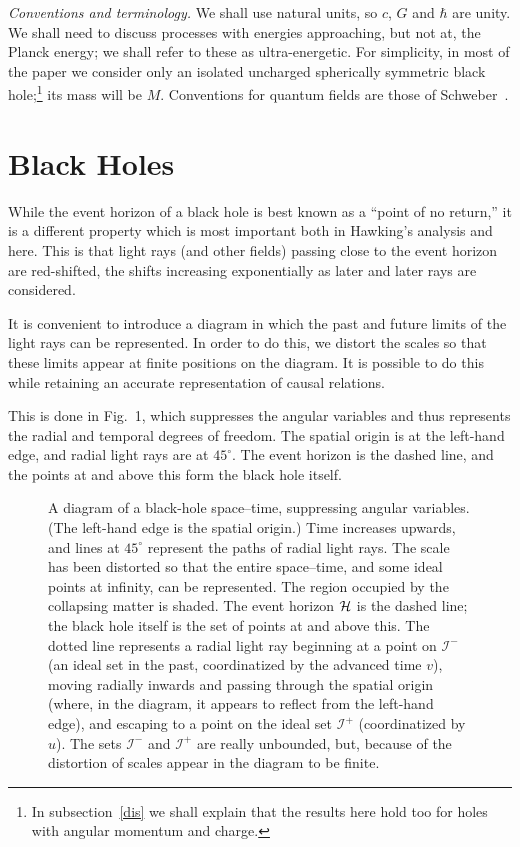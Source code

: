 \documentclass[11pt]{article}
\def\scrip{{\mathcal I}^-}
\def\scrif{{\mathcal I}^+}
\begin{document}
\textit{Conventions and terminology.}
We shall use natural units, so $c$, $G$ and $\hbar$ are unity.    We shall need
to discuss processes with  energies approaching, but not at, the Planck energy;
we shall refer to these as ultra-energetic. 
For simplicity, in most of the paper we consider only an isolated uncharged
spherically symmetric black hole;\footnote{In subsection~\ref{dis} we shall
explain that the results here hold too for holes with angular momentum and
charge.} its mass will be $M$.
Conventions for quantum fields are those of Schweber~\cite{Schweber:1961}.


\section{Black Holes}
\label{BH}

While the event horizon of a black hole is best known as a ``point of no
return,'' it is a different property which is most important both in Hawking's
analysis and here.  This is that light rays (and other fields) passing close to
the event horizon are red-shifted, the shifts increasing exponentially as later
and later rays are considered.

It is convenient to introduce a diagram in which the past and future limits of
the light rays can be represented.  In order to do this, we distort the scales
so that these limits appear at finite positions on the diagram.  It is possible
to do this while retaining an accurate representation of causal relations.

This is done in Fig.~1, which suppresses the angular variables and thus
represents the radial and temporal degrees of freedom.  The spatial origin is
at the left-hand edge, and radial light rays are at $45^\circ$.   The event
horizon is the dashed line, and the points at and above this form the black 
hole itself.  

\begin{figure}[t]
\epsfxsize=2in
\caption{A diagram of a black-hole space--time, suppressing angular
variables.  (The left-hand edge is the spatial origin.) Time increases
upwards, and lines at $45^\circ$ represent the paths of radial light
rays.   The scale has been distorted so that the entire space--time, and some
ideal points at infinity, can be represented.  The region occupied by the
collapsing matter is shaded.  The event horizon ${\cal H}$ is the dashed line; 
the black hole itself is the set of points at and above this. The dotted line
represents a radial light ray beginning at a point on $\scrip$ (an ideal set in
the past, coordinatized by the advanced time $v$), moving radially inwards and
passing through the spatial origin (where, in the diagram, it appears to
reflect from the left-hand edge), and escaping to a point on the ideal set
$\scrif$ (coordinatized by $u$).  The sets $\scrip$ and $\scrif$ are really
unbounded, but, because of the distortion of scales appear in the diagram to be
finite.}
\end{figure}
\end{document}
